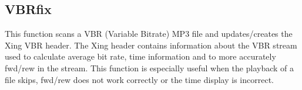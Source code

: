 \subsection{VBRfix}
This function scans a VBR (Variable Bitrate)
MP3 file and updates/creates the Xing VBR header. The Xing header
contains information about the VBR stream used to calculate average bit
rate, time information and to more accurately fwd/rew in the stream.
This function is especially useful when the playback of a file skips,
fwd/rew does not work correctly or the time display is incorrect. 

